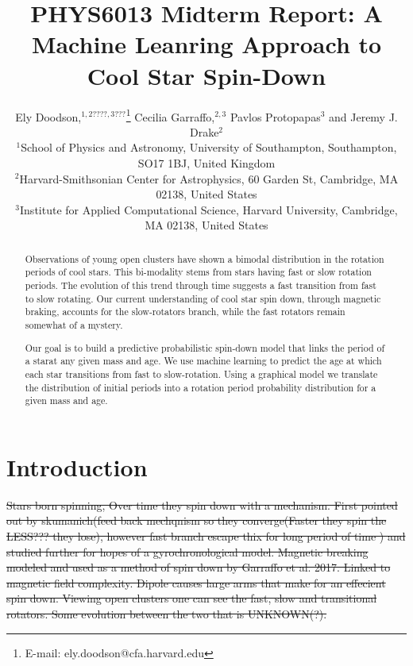 \documentclass[fleqn,usenatbib]{mnras}
\title{PHYS6013 Midterm Report: A Machine Leanring Approach to Cool Star Spin-Down}
\author[E. Doodson et al.]{
Ely Doodson,$^{1,2????,3???}$\thanks{E-mail: ely.doodson@cfa.harvard.edu}
Cecilia Garraffo,$^{2,3}$
Pavlos Protopapas$^{3}$
and Jeremy J. Drake$^{2}$
\\
$^{1}$School of Physics and Astronomy, University of Southampton,
Southampton, SO17 1BJ, United Kingdom\\
$^{2}$Harvard-Smithsonian Center for Astrophysics, 60 Garden St, Cambridge, MA 02138, United States \\
$^{3}$Institute for Applied Computational Science, Harvard University, Cambridge, MA 02138, United States
}
\begin{document}
\label{firstpage}
\pagerange{\pageref{firstpage}--\pageref{lastpage}}
\maketitle

\begin{abstract}
	Observations of young open clusters have shown a bimodal distribution in the rotation
	periods of cool stars.
	This bi-modality stems from stars having fast or slow rotation periods.
	The evolution of this trend through time suggests a fast transition from fast to slow rotating.
	Our current understanding of cool star spin down, through magnetic braking, accounts for the slow-rotators branch, while the fast rotators remain somewhat of a mystery.

	Our goal is to build a predictive probabilistic spin-down model that links the period of a starat any given mass and age.
	We use machine learning to predict the age at which each star transitions from fast to slow-rotation.
	Using a graphical model we translate the distribution of initial periods into a rotation period probability distribution for a given mass and age.
\end{abstract}


\section{Introduction}
\sout{Stars born spinning, Over time they spin down with a mechanism.
	First pointed out by skumanich(feed back mechqnism so they converge(Faster they spin the LESS??? they lose), however fast branch escape thix for long period of time ) and studied further for hopes of a gyrochronological model.
	Magnetic breaking modeled and used as a method of spin down by Garraffo et al. 2017.
	Linked to magnetic field complexity.
	Dipole causes large arms that make for an effecient spin down.
	Viewing open clusters one can see the fast, slow and transitional rotators.
	Some evolution between the two that is UNKNOWN(?).}
\end{document}
